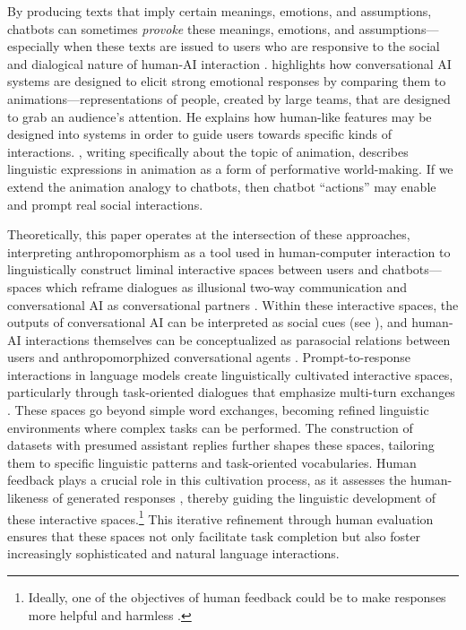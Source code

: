 By producing texts that imply certain meanings, emotions, and assumptions, chatbots can sometimes \textit{provoke} these meanings, emotions, and assumptions---especially when these texts are issued to users who are responsive to the social and dialogical nature of human-AI interaction \citep{hohenstein2023artificial}. \citet{stark2024animation} highlights how conversational AI systems are designed to elicit strong emotional responses by comparing them to animations---representations of people, created by large teams, that are designed to grab an audience's attention. He explains how human-like features may be designed into systems in order to guide users towards specific kinds of interactions. \citet{silvio2010animation}, writing specifically about the topic of animation, describes linguistic expressions in animation as a form of performative world-making. If we extend the animation analogy to chatbots, then chatbot ``actions'' may enable and prompt real social interactions. 

Theoretically, this paper operates at the intersection of these approaches, interpreting anthropomorphism as a tool used in human-computer interaction to linguistically construct liminal interactive spaces between users and chatbots---spaces which reframe dialogues as illusional two-way communication and conversational AI as conversational partners \citep{knoth2024ai}. Within these interactive spaces, the outputs of conversational AI can be interpreted as social cues (see \citet{feine2019taxonomy}), and human-AI interactions themselves can be conceptualized as parasocial relations between users and anthropomorphized conversational agents \citep{maeda2024when}. Prompt-to-response interactions in language models create linguistically cultivated interactive spaces, particularly through task-oriented dialogues that emphasize multi-turn exchanges \citep{wei2022chain}. These spaces go beyond simple word exchanges, becoming refined linguistic environments where complex tasks can be performed. The construction of datasets with presumed assistant replies \citep{kopf2024openassistant} further shapes these spaces, tailoring them to specific linguistic patterns and task-oriented vocabularies. Human feedback plays a crucial role in this cultivation process, as it assesses the human-likeness of generated responses \citep{zhang-etal-2020-dialogpt}, thereby guiding the linguistic development of these interactive spaces.\footnote{Ideally, one of the objectives of human feedback could be to make responses more helpful and harmless \citep{bai2022training, ganguli2022red}.} This iterative refinement through human evaluation ensures that these spaces not only facilitate task completion but also foster increasingly sophisticated and natural language interactions. 


